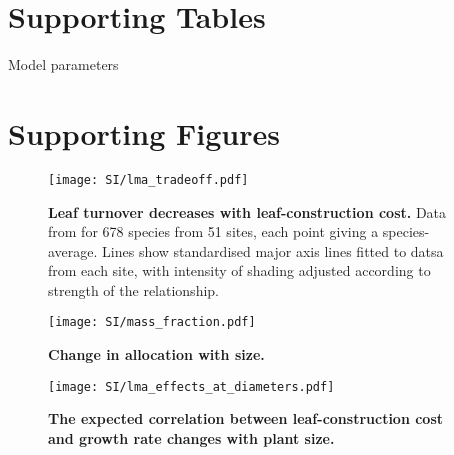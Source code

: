 \documentclass[10pt,twoside]{article}\usepackage[]{graphicx}\usepackage[]{color}
\date{}
\begin{document}
\maketitle

\tableofcontents

\renewcommand{\thefigure}{S\arabic{figure}}
\renewcommand{\thetable}{S\arabic{table}}
\setcounter{secnumdepth}{0}

\clearpage

\section{Supporting Tables}\label{app:supp_info_table}



\begin{table}[ht]
\caption{Model parameters}
\centering
{\footnotesize  %
\begin{doublespace}
% 

\end{doublespace}
}
\label{tab:params}
\end{table}

\newpage

\section{Supporting Figures}\label{app:supp_info_figures}

\begin{figure}[ht]
\centering
\texttt{[image: SI/lma\_tradeoff.pdf]}
\caption{\textbf{Leaf turnover decreases with leaf-construction cost.}
Data from \citep{Wright-2004} for 678 species from 51 sites, each
point giving a species-average. Lines show standardised major axis lines
fitted to datsa from each site, with intensity of shading adjusted
according to strength of the relationship.\label{fS-leaf}}
\end{figure}


\newpage

\begin{figure}[ht]
\centering
\texttt{[image: SI/mass\_fraction.pdf]}
\caption{\textbf{Change in allocation with size.}
\label{f-mass_fraction}}
\end{figure}

\newpage

\begin{figure}[ht]
\centering
\texttt{[image: SI/lma\_effects\_at\_diameters.pdf]}
\caption{\textbf{The expected correlation between leaf-construction cost
and growth rate changes with plant size.} \label{f-lma_growth_size}}
\end{figure}
\end{document}
